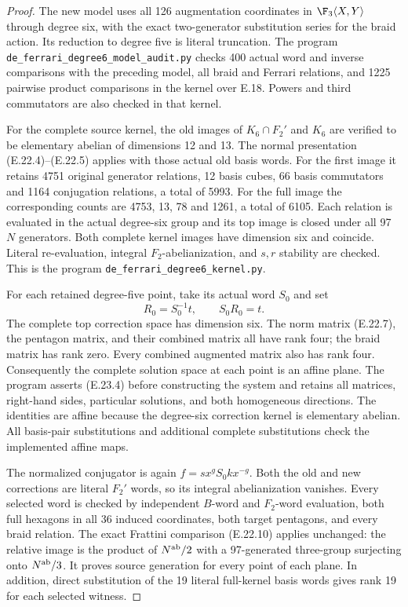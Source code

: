 \begin{proof}
The new model uses all 126 augmentation
coordinates in $\F_3\langle X,Y\rangle$
through degree six, with the exact
two-generator substitution series for
the braid action. Its reduction to
degree five is literal truncation.
The program
\texttt{de\_ferrari\_degree6\_model\_audit.py}
checks 400 actual word and inverse
comparisons with the preceding model,
all braid and Ferrari relations, and
1225 pairwise product comparisons in
the kernel over E.18. Powers and
third commutators are also checked
in that kernel.

For the complete source kernel,
the old images of $K_6\cap F_2'$
and $K_6$ are verified to be
elementary abelian of dimensions
12 and 13. The normal presentation
(E.22.4)--(E.22.5) applies with
those actual old basis words.
For the first image it retains
4751 original generator relations,
12 basis cubes, 66 basis
commutators and 1164 conjugation
relations, a total of 5993.
For the full image the corresponding
counts are 4753, 13, 78 and 1261,
a total of 6105. Each relation
is evaluated in the actual
degree-six group and its top
image is closed under all
97 $N$ generators. Both complete
kernel images have dimension
six and coincide. Literal
re-evaluation, integral
$F_2$-abelianization, and
$s,r$ stability are checked.
This is the program
\texttt{de\_ferrari\_degree6\_kernel.py}.

For each retained degree-five point,
take its actual word $S_0$ and set
\[
 R_0=S_0^{-1}t,\qquad S_0R_0=t.
 \tag{E.23.4}
\]
The complete top correction space
has dimension six. The norm
matrix (E.22.7), the pentagon
matrix, and their combined
matrix all have rank four;
the braid matrix has rank
zero. Every combined augmented
matrix also has rank four.
Consequently the complete
solution space at each point
is an affine plane. The
program asserts (E.23.4)
before constructing the system
and retains all matrices,
right-hand sides, particular
solutions, and both homogeneous
directions. The identities
are affine because the
degree-six correction kernel
is elementary abelian.
All basis-pair substitutions
and additional complete
substitutions check the
implemented affine maps.

The normalized conjugator is
again $f=sx^g S_0k x^{-g}$.
Both the old and new
corrections are literal
$F_2'$ words, so its integral
abelianization vanishes.
Every selected word is checked
by independent $B$-word and
$F_2$-word evaluation, both
full hexagons in all 36
induced coordinates, both
target pentagons, and every
braid relation. The exact
Frattini comparison (E.22.10)
applies unchanged: the
relative image is the product
of $N^{\rm ab}/2$ with a
97-generated three-group
surjecting onto $N^{\rm ab}/3$.
It proves source generation
for every point of each
plane. In addition, direct
substitution of the 19
literal full-kernel basis
words gives rank 19 for
each selected witness.


\end{proof}

